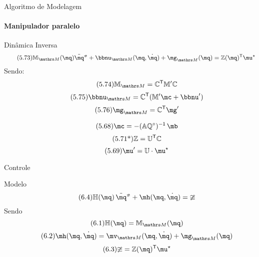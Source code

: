 \documentclass[25pt,landscape]{beamer}
\begin{document}
\begin{frame}{Algoritmo de Modelagem}
    \framesubtitle{Manipulador paralelo}
    \begin{block}{Dinâmica Inversa}
    	\begin{equation} \label{eq:DinamicaInversa2} \tag{5.73}
			\mM_{\ssM} (\mq) \ddot{\mq}\ssh + \mnu_{\ssM}(\mq, \dot{\mq}) + \mg_{\ssM}(\mq)   = \mZ(\mq)^{\msT} \mu^\star
		\end{equation}
		Sendo: 
		\begin{equation} \tag{5.74}
			\mM_{\ssM}  =  \mC^\msT \mM' \mC
		\end{equation}
		\begin{equation} \tag{5.75}
			\mnu_{\ssM}  =  \mC^\msT (  \mM'  \mc  + \mnu' )
		\end{equation}
		\begin{equation} \tag{5.76}
			\mg_{\ssM}  = \mC^\msT \mg'
		\end{equation}

		\begin{equation} \tag{5.68}
			\mc = - (\mA \mQ\cir)^\msI \, \mb
		\end{equation}
		\begin{equation} \tag{5.71*}
			\mathbb{Z} = \mathbb{U}^{\mathsf{T}} \mathbb{C}
		\end{equation}
		\begin{equation} \label{eq:u_estrela} \tag{5.69}
			\mu' = \mU \cdot \mu^\star
		\end{equation}
    \end{block}
\end{frame}

\begin{frame}{Controle}
    \begin{block}{Modelo}
    	\begin{equation} \label{eq:ModeloControle} \tag{6.4}
			\mH(\mq) \, \ddot{\mq}\ssh + \mh(\mq,\dot{\mq}) = \mup
		\end{equation}
		Sendo
		\begin{equation} \tag{6.1}
			\mH(\mq) = \mM_{\ssM}(\mq)
		\end{equation}
		\begin{equation} \tag{6.2}
			\mh(\mq, \dot{\mq}) = \mv_{\ssM}(\mq, \dot{\mq}) + \mg_{\ssM}(\mq)
		\end{equation}
		\begin{equation} \tag{6.3}
			\mup = \mZ(\mq)^{\msT} \mu^\star
		\end{equation}
    \end{block}
\end{frame}
\end{document}
